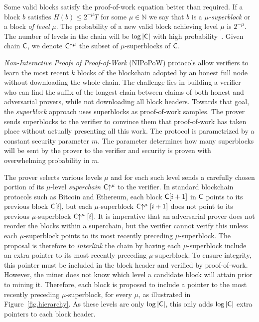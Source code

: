 Some valid blocks satisfy the proof-of-work equation better than required. If
a block $b$ satisfies $H(b) \leq 2^{-\mu} T$ for some
$\mu \in \mathbb{N}$ we say that $b$ is a \emph{$\mu$-superblock} or a block
\emph{of level} $\mu$. The probability of a new valid block achieving level
$\mu$ is $2^{-\mu}$. The number of levels in the chain will be $\log|\mathsf{C}|$
with high probability~\cite{popow}. Given chain $\mathsf{C}$, we denote
$\mathsf{C}\negthickspace\uparrow^\mu$ the subset of $\mu$-superblocks of $\mathsf{C}$.

\emph{Non-Interactive Proofs of Proof-of-Work} (NIPoPoW) protocols allow verifiers to
learn the most recent $k$ blocks of the blockchain adopted by an honest full
node without downloading the whole chain. The challenge lies in building a
verifier who can find the suffix of the longest chain between claims of both
honest and adversarial provers, while not downloading all block headers. Towards
that goal, the \emph{superblock} approach uses superblocks as proof-of-work samples.
The prover sends superblocks to the verifier to convince them
that proof-of-work has taken place without actually presenting all this
work. The protocol is parametrized by a constant security parameter
$m$. The parameter determines how many superblocks will be sent by the prover to
the verifier and security is proven with overwhelming probability in $m$.

The prover selects various levels $\mu$ and for each such level sends a
carefully chosen portion of its $\mu$-level \emph{superchain}
$\mathsf{C}\negthickspace\uparrow^\mu$ to the verifier. In standard blockchain protocols such as
Bitcoin and Ethereum, each block $\mathsf{C}[i + 1]$ in $\mathsf{C}$ points to its
previous block $\mathsf{C}[i]$, but each $\mu$-superblock $\mathsf{C}\negthickspace\uparrow^\mu[i +
1]$ does not point to its previous $\mu$-superblock $\mathsf{C}\negthickspace\uparrow^\mu[i]$. It
is imperative that an adversarial prover does not reorder the blocks within a
superchain, but the verifier cannot verify this unless each $\mu$-superblock
points to its most recently preceding $\mu$-superblock. The proposal is
therefore to \emph{interlink} the chain by having each $\mu$-superblock include
an extra pointer to its most recently preceding $\mu$-superblock. To ensure
integrity, this pointer must be included in the block header and verified by
proof-of-work. However, the miner does not know which level a candidate block
will attain prior to mining it. Therefore, each block is proposed to
include a pointer to the most recently preceding $\mu$-superblock, for every
$\mu$, as illustrated in Figure~\ref{fig.hierarchy}. As these levels are only
$\log|\mathsf{C}|$, this only adds $\log|\mathsf{C}|$ extra pointers to each block
header.

